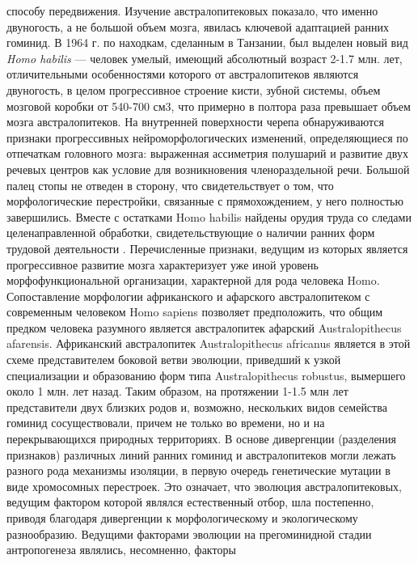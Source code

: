 \documentclass[12pt]{article}
\begin{document}
способу передвижения. Изучение австралопитековых показало, что именно двуногость, а не большой объем
мозга, явилась ключевой адаптацией ранних гоминид. В 1964 г. по находкам, сделанным в Танзании, был
выделен  новый  вид  \textit{Homo  habilis}  --- человек  умелый,  имеющий  абсолютный  возраст  2-1.7  млн.  лет,
отличительными особенностями которого от австралопитеков являются двуногость, в целом прогрессивное
строение  кисти,  зубной  системы,  объем  мозговой  коробки  от  540-700  см3,  что  примерно  в  полтора  раза
превышает  объем  мозга  австралопитеков.  На  внутренней  поверхности  черепа  обнаруживаются  признаки
прогрессивных  нейроморфологических  изменений,  определяющиеся  по  отпечаткам  головного  мозга:
выраженная  ассиметрия  полушарий  и  развитие  двух  речевых  центров  как  условие  для  возникновения
членораздельной  речи.  Большой  палец  стопы  не  отведен  в  сторону,  что  свидетельствует  о  том,  что
морфологические  перестройки,  связанные  с  прямохождением,  у  него  полностью  завершились.  Вместе  с
остатками Homo habilis найдены орудия труда со следами целенаправленной обработки, свидетельствующие о
наличии ранних форм трудовой деятельности .
Перечисленные признаки, ведущим из которых является прогрессивное развитие мозга характеризует уже иной
уровень  морфофункциональной  организации,  характерной  для  рода  человека   Homo.  Сопоставление
морфологии африканского и афарского австралопитеком с современным человеком Homo sapiens позволяет
предположить,  что  общим  предком  человека  разумного  является  австралопитек  афарский  Australopithecus
afarensis. Африканский австралопитек Australopithecus africanus является в этой схеме представителем боковой
ветви  эволюции,  приведший  к  узкой  специализации  и  образованию  форм  типа  Australopithecus  robustus,
вымершего около 1 млн. лет назад. Таким образом, на протяжении 1-1.5 млн лет представители двух близких
родов и, возможно, нескольких видов семейства гоминид сосуществовали, причем не только во времени, но и на
перекрывающихся природных территориях. В основе дивергенции (разделения признаков) различных линий
ранних  гоминид  и  австралопитеков  могли  лежать  разного  рода  механизмы  изоляции,  в  первую  очередь
генетические  мутации  в  виде  хромосомных  перестроек.  Это  означает,  что  эволюция  австралопитековых,
ведущим фактором которой являлся естественный отбор, шла постепенно, приводя благодаря дивергенции к
морфологическому и экологическому разнообразию.
Ведущими  факторами  эволюции  на  прегоминидной  стадии  антропогенеза  являлись,  несомненно,  факторы
\end{document}
